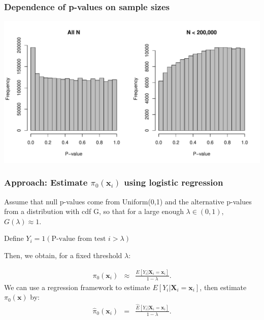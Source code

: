 \documentclass{beamer}
\newcommand{\bX}{\mathbf{X}}
\newcommand{\bx}{\mathbf{x}}
\begin{document}

\begin{frame}
\frametitle{Dependence of p-values on sample sizes}

\begin{center}
\includegraphics[scale=0.55]{Fig1-1.pdf} 
\end{center}

\end{frame}


\begin{frame}
\frametitle{Approach: Estimate $\pi_0(\bx_i)$ using logistic regression}

Assume that null p-values come from Uniform(0,1) and the alternative p-values from a distribution with cdf G,
so that for a large enough $\lambda \in (0,1)$, $G(\lambda) \approx 1$.

\vspace{0.5cm}
Define $Y_i = 1(\mbox{P-value from test $i > \lambda$})$

\vspace{0.5cm}
Then, we obtain, for a fixed threshold $\lambda$:

\begin{eqnarray*}
\pi_0(\bx_i) &\approx& \frac{E[Y_i|\bX_i=\bx_i] }{1-\lambda}.
\end{eqnarray*}
We can use a regression framework to estimate $E[Y_i|\bX_i=\bx_i]$, then estimate
$\pi_0(\bx)$ by:
\begin{eqnarray*}
\label{eq:est-pio-x}
\hat{\pi}_0(\bx_i) &=& \frac{\hat{E}[Y_i|\bX_i=\bx_i] }{1-\lambda}.
\end{eqnarray*}

\end{frame}
\end{document}
